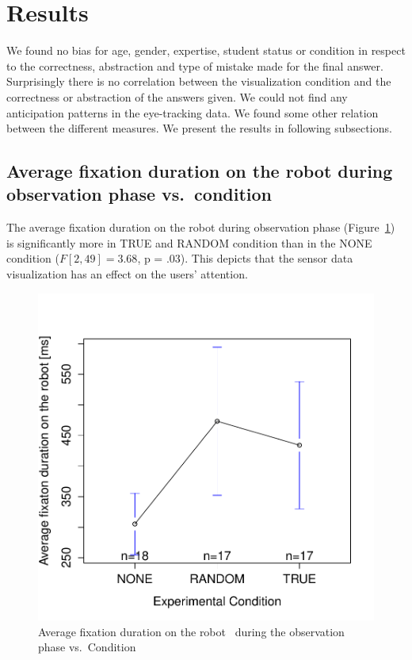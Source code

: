 \documentclass{sig-alternate}
\begin{document}

\section{Results}

We found no bias for age, gender, expertise, student status or condition
in respect to the correctness, abstraction and type of mistake made for
the final answer. Surprisingly there is no correlation between the
visualization condition and the correctness or abstraction of the
answers given. We could not find any anticipation patterns in the
eye-tracking data. We found some other relation between the different
measures. We present the results in following subsections.

\subsection{Average fixation duration on the robot during observation phase
vs.~condition}

The average fixation duration on the robot during observation phase
(Figure~\ref{res1}) is significantly more in TRUE and RANDOM condition than in
the NONE condition ($F[2,49]=3.68$, p = .03). This depicts that the
sensor data visualization has an effect on the users' attention.

\begin{figure}[h!]
    \centering
    \includegraphics[width=0.8\linewidth]{meanPlotFixRobo.pdf}
    \caption{Average fixation duration on the robot ~during the observation phase
    vs.~Condition}
    \label{res1}
\end{figure}
\end{document}
